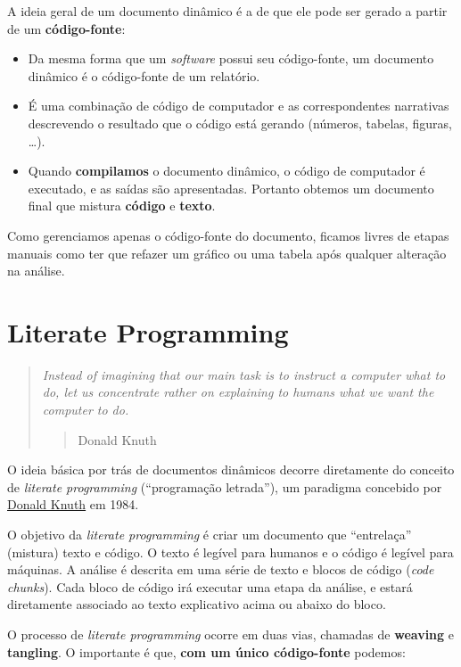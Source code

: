 \documentclass[10pt,a4paper]{book}
\providecommand{\tightlist}{%
  \setlength{\itemsep}{0pt}\setlength{\parskip}{0pt}}
\begin{document}
A ideia geral de um documento dinâmico é a de que ele pode ser gerado a
partir de um \textbf{código-fonte}:

\begin{itemize}
\tightlist
\item
  Da mesma forma que um \emph{software} possui seu código-fonte, um
  documento dinâmico é o código-fonte de um relatório.
\item
  É uma combinação de código de computador e as correspondentes
  narrativas descrevendo o resultado que o código está gerando (números,
  tabelas, figuras, \ldots{}).
\item
  Quando \textbf{compilamos} o documento dinâmico, o código de
  computador é executado, e as saídas são apresentadas. Portanto obtemos
  um documento final que mistura \textbf{código} e \textbf{texto}.
\end{itemize}

Como gerenciamos apenas o código-fonte do documento, ficamos livres de
etapas manuais como ter que refazer um gráfico ou uma tabela após
qualquer alteração na análise.

\section{Literate Programming}\label{literate-programming}

\begin{quote}
\emph{Instead of imagining that our main task is to instruct a computer
what to do, let us concentrate rather on explaining to humans what we
want the computer to do.}

\begin{quote}
Donald Knuth
\end{quote}
\end{quote}

O ideia básica por trás de documentos dinâmicos decorre diretamente do
conceito de \emph{literate programming} (``programação letrada''), um
paradigma concebido por
\href{https://en.wikipedia.org/wiki/Donald_Knuth}{Donald Knuth} em 1984.

O objetivo da \emph{literate programming} é criar um documento que
``entrelaça'' (mistura) texto e código. O texto é legível para humanos e
o código é legível para máquinas. A análise é descrita em uma série de
texto e blocos de código (\emph{code chunks}). Cada bloco de código irá
executar uma etapa da análise, e estará diretamente associado ao texto
explicativo acima ou abaixo do bloco.

O processo de \emph{literate programming} ocorre em duas vias, chamadas
de \textbf{weaving} e \textbf{tangling}. O importante é que, \textbf{com
um único código-fonte} podemos:
\end{document}
